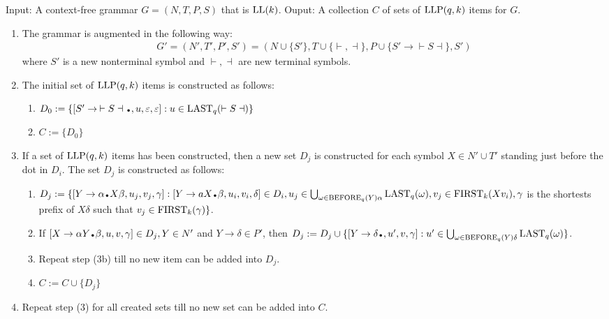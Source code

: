 \begin{algorithm}
    Input: A context-free grammar $G = (N, T, P, S)$ that is $\text{LL}(k)$. Ouput: A collection $C$ of sets of $\text{LLP}(q, k)$ items for $G$.
    \begin{enumerate}
        \item The grammar is augmented in the following way:
        \begin{align*}
            G' = (N', T', P', S') = (N \cup \{S'\}, T \cup \{\vdash, \dashv\}, P \cup \{S' \to \vdash S \dashv\}, S')
        \end{align*}
        where $S'$ is a new nonterminal symbol and $\vdash, \dashv$ are new terminal symbols.
        \item The initial set of $\text{LLP}(q, k)$ items is constructed as follows:
        \begin{enumerate}
            \item $D_0 := \{[S' \to \: \vdash S \dashv \bigdot, u, \varepsilon, \varepsilon] : u \in \LAST_q(\vdash S \dashv) \}$
            \item $C := \{D_0\}$
        \end{enumerate}
        \item If a set of $\text{LLP}(q, k)$ items has been constructed, then a new set $D_j$ is constructed
        for each symbol $X \in N' \cup T'$ standing just before the dot in $D_i$. The set $D_j$ is constructed as follows:
        \begin{enumerate}
            \item $D_j := \{[Y \to \alpha\bigdot X \beta, u_j, v_j, \gamma] : [Y \to aX\bigdot\beta, u_i, v_i, \delta] \in D_i, u_j \in \bigcup_{\omega \in \BEFORE_q(Y) \alpha} \LAST_q(\omega), v_j \in \FIRST_k(Xv_i), \gamma$ is the shortests prefix of $X\delta$ such that $v_j \in \text{FIRST}_k(\gamma)\}$.
            \item If $[X \to \alpha Y\bigdot \beta, u, v,\gamma] \in D_j, Y \in N'$ and $Y \to \delta \in P'$, then $D_j := D_j \cup \{[Y \to \delta \bigdot , u', v, \gamma] : u' \in \bigcup_{\omega \in \BEFORE_q(Y) \delta} \LAST_q(\omega)\}$.
            \item Repeat step (3b) till no new item can be added into $D_j$.
            \item $C := C \cup \{D_j\}$
        \end{enumerate}
        \item Repeat step (3) for all created sets till no new set can be added into $C$.
    \end{enumerate}
\end{algorithm}

